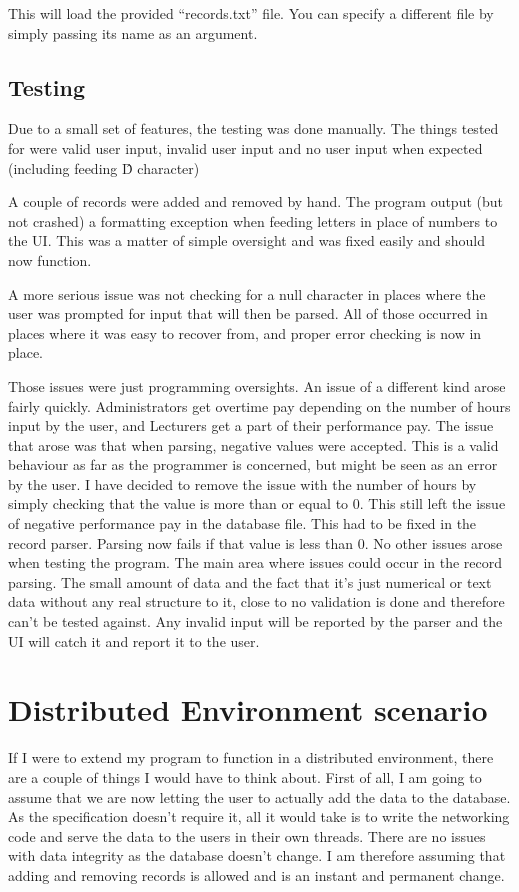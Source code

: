 \documentclass{report}
\begin{document}
This will load the provided ``records.txt'' file. You can specify a different file by simply passing its name as an argument.

\subsection*{Testing}
Due to a small set of features, the testing was done manually. The things tested for were valid user input, invalid user input and no user input when expected (including feeding \^D character)

A couple of records were added and removed by hand. The program output (but not crashed) a formatting exception when feeding letters in place of numbers to the UI. This was a matter of simple oversight and was fixed easily and should now function.

A more serious issue was not checking for a null character in places where the user was prompted for input that will then be parsed. All of those occurred in places where it was easy to recover from, and proper error checking is now in place.

Those issues were just programming oversights. An issue of a different kind arose fairly quickly. Administrators get overtime pay depending on the number of hours input by the user, and Lecturers get a part of their performance pay. The issue that arose was that when parsing, negative values were accepted. This is a valid behaviour as far as the programmer is concerned, but might be seen as an error by the user. I have decided to remove the issue with the number of hours by simply checking that the value is more than or equal to 0. This still left the issue of negative performance pay in the database file. This had to be fixed in the record parser. Parsing now fails if that value is less than 0. No other issues arose when testing the program. The main area where issues could occur in the record parsing. The small amount of data and the fact that it's just numerical or text data without any real structure to it, close to no validation is done and therefore can't be tested against. Any invalid input will be reported by the parser and the UI will catch it and report it to the user.


\section*{Distributed Environment scenario}
If I were to extend my program to function in a distributed environment, there are a couple of things I would have to think about. First of all, I am going to assume that we are now letting the user to actually add the data to the database. As the specification doesn't require it, all it would take is to write the networking code and serve the data to the users in their own threads. There are no issues with data integrity as the database doesn't change. I am therefore assuming that adding and removing records is allowed and is an instant and permanent change.
\end{document}
